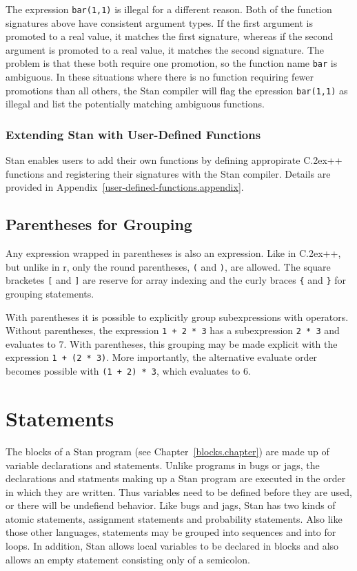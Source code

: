 \documentclass[10pt]{report}
\newcommand{\Stan}{Stan\xspace}
\newcommand*{\Cpp}{C\raise.2ex\hbox{\footnotesize ++}\xspace} %
\newcommand{\acronym}[1]{{\sc #1}\xspace}
\newcommand{\R}{\acronym{r}}
\newcommand{\BUGS}{\acronym{bugs}}
\newcommand{\JAGS}{\acronym{jags}}
\newcommand{\code}[1]{{\tt #1}}
\newcommand{\refappendix}[1]{Appendix~\ref{#1.appendix}}
\newcommand{\refchapter}[1]{Chapter~\ref{#1.chapter}}
\begin{document}
The expression \code{bar(1,1)} is illegal for a different reason.
Both of the function signatures above have consistent argument types.
If the first argument is promoted to a real value, it matches the
first signature, whereas if the second argument is promoted to a real
value, it matches the second signature.  The problem is that these
both require one promotion, so the function name \code{bar} is
ambiguous.  In these situations where there is no function requiring
fewer promotions than all others, the \Stan compiler will flag the
epression \code{bar(1,1)} as illegal and list the potentially matching
ambiguous functions.


\subsection{Extending \Stan with User-Defined Functions}

\Stan enables users to add their own functions by defining appropirate
\Cpp functions and registering their signatures with the \Stan
compiler.  Details are provided in \refappendix{user-defined-functions}.


\section{Parentheses for Grouping}

Any expression wrapped in parentheses is also an expression. Like in
\Cpp, but unlike in \R, only the round parentheses, \code{(} and
\code{)}, are allowed.  The square bracketes \code{[} and \code{]} are
reserve for array indexing and the curly braces \code{\{} and
\code{\}} for grouping statements.

With parentheses it is possible to explicitly group subexpressions
with operators.  Without parentheses, the expression \code{1 + 2 * 3}
has a subexpression \code{2 * 3} and evaluates to 7.  With
parentheses, this grouping may be made explicit with the expression
\code{1 + (2 * 3)}.  More importantly, the alternative evaluate order
becomes possible with \code{(1 + 2) * 3}, which evaluates to 6.



\chapter{Statements}

The blocks of a \Stan program (see \refchapter{blocks}) are made up of
variable declarations and statements.  Unlike programs in \BUGS or
\JAGS, the declarations and statments making up a \Stan program are
executed in the order in which they are written.  Thus variables need
to be defined before they are used, or there will be undefiend
behavior.  Like \BUGS and \JAGS, \Stan has two kinds of atomic
statements, assignment statements and probability statements.  Also
like those other languages, statements may be grouped into sequences
and into for loops.  In addition, \Stan allows local variables to be
declared in blocks and also allows an empty statement consisting only
of a semicolon.
\end{document}

